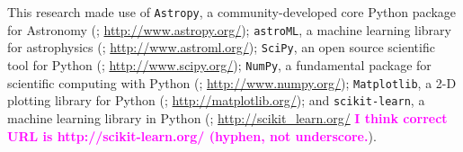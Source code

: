 \documentclass[useamsfonts]{pasj01}
\newcommand{\susan}[1]{\textcolor{magenta} {\textbf{#1}}}
\begin{document}
\begin{ack}
    This research made use of
    {\texttt{Astropy}},
        a community-developed core Python package for Astronomy (\citealt{Astropy};
        \url{http://www.astropy.org/});
    {\texttt{astroML}},
        a machine learning library for astrophysics (\citealt{astroml};
        \url{http://www.astroml.org/});
    {\texttt{SciPy}},
        an open source scientific tool for Python (\citealt{SciPy};
        \url{http://www.scipy.org/});
    {\texttt{NumPy}},
        a fundamental package for scientific computing with Python (\citealt{NumPy};
        \url{http://www.numpy.org/});
    {\texttt{Matplotlib}},
        a 2-D plotting library for Python (\citealt{Matplotlib};
        \url{http://matplotlib.org/}); and
    {\texttt{scikit-learn}},
        a machine learning library in Python (\citealt{scikit-learn};
        \url{http://scikit_learn.org/} \susan{I think correct URL is http://scikit-learn.org/ (hyphen, not underscore.}).

\end{ack}


%


\end{document}

